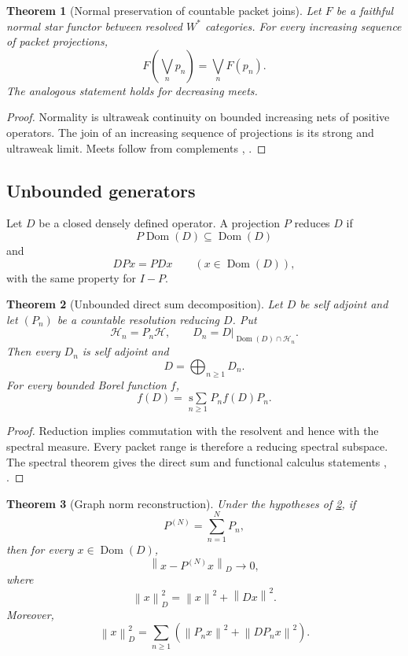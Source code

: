 \documentclass{aomart}
\newtheorem{theorem}{Theorem}[section]
\theoremstyle{definition}
\theoremstyle{remark}
\newcommand{\Hh}{\mathcal H}
\newcommand{\norm}[1]{\left\lVert#1\right\rVert}
\newcommand{\Rcite}[1]{\cite{#1}}
\begin{document}
\begin{theorem}[Normal preservation of countable packet joins]\label{thm:normal_joins}
Let \(F\) be a faithful normal star functor between resolved \(W^*\) categories. For every increasing sequence of packet projections,
\[
 F\left(\bigvee_np_n\right)
 =
 \bigvee_nF(p_n).
\]
The analogous statement holds for decreasing meets.
\end{theorem}

\begin{proof}
Normality is ultraweak continuity on bounded increasing nets of positive operators. The join of an increasing sequence of projections is its strong and ultraweak limit. Meets follow from complements \Rcite{R2}, \Rcite{R8}.
\end{proof}

\subsection{Unbounded generators}

\begin{definition}\label{def:unbounded_reduction}
Let \(D\) be a closed densely defined operator. A projection \(P\) reduces \(D\) if
\[
 P\operatorname{Dom}(D)\subseteq\operatorname{Dom}(D)
\]
and
\[
 DPx=PDx
 \qquad
 (x\in\operatorname{Dom}(D)),
\]
with the same property for \(I-P\).
\end{definition}

\begin{theorem}[Unbounded direct sum decomposition]\label{thm:unbounded_direct_sum}
Let \(D\) be self adjoint and let \((P_n)\) be a countable resolution reducing \(D\). Put
\[
 \Hh_n=P_n\Hh,
 \qquad
 D_n=D|_{\operatorname{Dom}(D)\cap\Hh_n}.
\]
Then every \(D_n\) is self adjoint and
\[
 \boxed{
 D=\bigoplus_{n\ge1}D_n.
 }
\]
For every bounded Borel function \(f\),
\[
 f(D)
 =
 \operatorname*{s\!\!\sum}_{n\ge1}
 P_nf(D)P_n.
\]
\end{theorem}

\begin{proof}
Reduction implies commutation with the resolvent and hence with the spectral measure. Every packet range is therefore a reducing spectral subspace. The spectral theorem gives the direct sum and functional calculus statements \Rcite{R10}, \Rcite{R20}.
\end{proof}

\begin{theorem}[Graph norm reconstruction]\label{thm:graph_norm}
Under the hypotheses of \cref{thm:unbounded_direct_sum}, if
\[
 P^{(N)}=\sum_{n=1}^{N}P_n,
\]
then for every \(x\in\operatorname{Dom}(D)\),
\[
 \norm{x-P^{(N)}x}_D\longrightarrow0,
\]
where
\[
 \norm{x}_D^2=\norm{x}^2+\norm{Dx}^2.
\]
Moreover,
\[
 \norm{x}_D^2
 =
 \sum_{n\ge1}
 \left(
 \norm{P_nx}^2+\norm{DP_nx}^2
 \right).
\]
\end{theorem}
\end{document}
